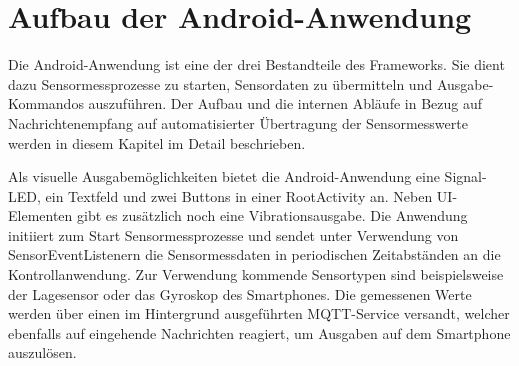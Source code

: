 \documentclass[11pt,a4paper]{report}
\begin{document}
\chapter{Aufbau der Android-Anwendung}\label{chap:app}
Die Android-Anwendung ist eine der drei Bestandteile des Frameworks.
Sie dient dazu Sensormessprozesse zu starten, Sensordaten zu übermitteln und Ausgabe-Kommandos auszuführen.
Der Aufbau und die internen Abläufe in Bezug auf Nachrichtenempfang auf automatisierter Übertragung der Sensormesswerte werden in diesem Kapitel im Detail beschrieben.

Als visuelle Ausgabemöglichkeiten bietet die Android-Anwendung eine Signal-LED, ein Textfeld und zwei Buttons in einer RootActivity an.
Neben UI-Elementen gibt es zusätzlich noch eine Vibrationsausgabe. 
Die Anwendung initiiert zum Start Sensormessprozesse und sendet unter Verwendung von SensorEventListenern die Sensormessdaten in periodischen Zeitabständen an die Kontrollanwendung.
Zur Verwendung kommende Sensortypen sind beispielsweise der Lagesensor oder das Gyroskop des Smartphones.
Die gemessenen Werte werden über einen im Hintergrund ausgeführten MQTT-Service versandt, welcher ebenfalls auf eingehende Nachrichten reagiert, um Ausgaben auf dem Smartphone auszulösen.
\end{document}
